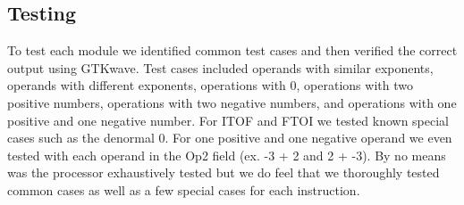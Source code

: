 \documentclass{article}
\begin{document}
\begin{multicols}{2}
  \section{Testing}
To test each module we identified common test cases and then verified the correct output using GTKwave. Test cases included operands with similar exponents, operands with different exponents, operations with 0, operations with two positive numbers, operations with two negative numbers, and operations with one positive and one negative number. For ITOF and FTOI we tested known special cases such as the denormal 0. For one positive and one negative operand we even tested with each operand in the Op2 field (ex. -3 + 2 and 2 + -3). By no means was the processor exhaustively tested but we do feel that we thoroughly tested common cases as well as a few special cases for each instruction.

  
\end{multicols}
\end{document}
